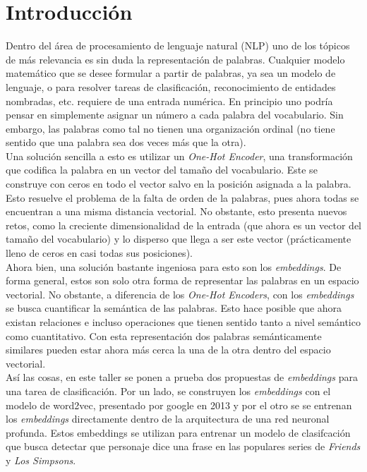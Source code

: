 \section{Introducción}

Dentro del área de procesamiento de lenguaje natural (NLP) uno de los tópicos de más relevancia es sin duda la representación de palabras. Cualquier modelo matemático que se desee formular a partir de palabras, ya sea un modelo de lenguaje, o para resolver tareas de clasificación, reconocimiento de entidades nombradas, etc. requiere de una entrada numérica. En principio uno podría pensar en simplemente asignar un número a cada palabra del vocabulario. Sin embargo, las palabras como tal no tienen una organización ordinal (no tiene sentido que una palabra sea dos veces más que la otra). \\

Una solución sencilla a esto es utilizar un \textit{One-Hot Encoder}, una transformación que codifica la palabra en un vector del tamaño del vocabulario. Este se construye con ceros en todo el vector salvo en la posición asignada a la palabra. Esto resuelve el problema de la falta de orden de la palabras, pues ahora todas se encuentran a una misma distancia vectorial. No obstante, esto presenta nuevos retos, como la creciente dimensionalidad de la entrada (que ahora es un vector del tamaño del vocabulario) y lo disperso que llega a ser este vector (prácticamente lleno de ceros en casi todas sus posiciones). \\

Ahora bien, una solución bastante ingeniosa para esto son los \textit{embeddings}. De forma general, estos son solo otra forma de representar las palabras en un espacio vectorial. No obstante, a diferencia de los \textit{One-Hot Encoders}, con los \textit{embeddings} se busca cuantificar la semántica de las palabras. Esto hace posible que ahora existan relaciones e incluso operaciones que tienen sentido tanto a nivel semántico como cuantitativo. Con esta representación dos palabras semánticamente similares pueden estar ahora más cerca la una de la otra dentro del espacio vectorial. \\

Así las cosas, en este taller se ponen a prueba dos propuestas de \textit{embeddings} para una tarea de clasificación. Por un lado, se construyen los \textit{embeddings} con el modelo de word2vec, presentado por google en 2013 y por el otro se se entrenan los \textit{embeddings} directamente dentro de la arquitectura de una red neuronal profunda. Estos embeddings se utilizan para entrenar un modelo de clasifcación que busca detectar que personaje dice una frase en las populares series de \textit{Friends} y \textit{Los Simpsons}.

\newpage